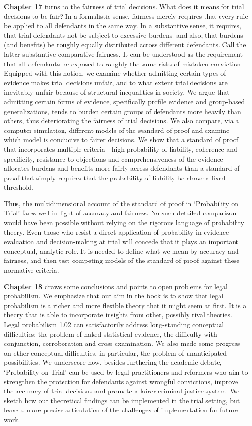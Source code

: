\documentclass[
  10pt,
  dvipsnames,enabledeprecatedfontcommands]{scrartcl}
\begin{document}
\textbf{Chapter 17} turns to the fairness of trial decisions. What does
it means for trial decisions to be fair? In a formalistic sense,
fairness merely requires that every rule be applied to all defendants in
the same way. In a substantive sense, it requires, that trial defendants
not be subject to excessive burdens, and also, that burdens (and
benefits) be roughly equally distributed across different defendants.
Call the latter substantive comparative fairness. It can be understood
as the requirement that all defendants be exposed to roughly the same
risks of mistaken conviction. Equipped with this notion, we examine
whether admitting certain types of evidence makes trial decisions
unfair, and to what extent trial decisions are inevitably unfair because
of structural inequalities in society. We argue that admitting certain
forms of evidence, specifically profile evidence and group-based
generalizations, tends to burden certain groups of defendants more
heavily than others, thus deteriorating the fairness of trial decisions.
We also compare, via a computer simulation, different models of the
standard of proof and examine which model is conducive to fairer
decisions. We show that a standard of proof that incorporates multiple
criteria---high probability of liability, coherence and specificity,
resistance to objections and comprehensiveness of the
evidence---allocates burdens and benefits more fairly across defendants
than a standard of proof that simply requires that the probability of
liability be above a fixed threshold.

Thus, the multidimensional account of the standard of proof in
`Probability on Trial' fares well in light of accuracy and fairness. No
such detailed comparison would have been possible without relying on the
rigorous language of probability theory. Even those who resist a direct
application of probability in evidence evaluation and decision-making at
trial will concede that it plays an important conceptual, analytic role.
It is needed to define what we mean by accuracy and fairness, and then
test competing models of the standard of proof against these normative
criteria.

\textbf{Chapter 18} draws some conclusions and points to open problems
for legal probabilism. We emphasize that our aim in the book is to show
that legal probabilism is a richer and more flexible theory that it
might seem at first. It is a theory that is able to incorporate insights
from other, possibly rival theories. Legal probabilism 1.02 can
satisfactorily address long-standing conceptual difficulties: the
problem of naked statistical evidence, the difficulty with conjunction,
corroboration and cross-examination. We also made some progress on other
conceptual difficulties, in particular, the problem of unanticipated
possibilities. We underscore how, besides furthering the academic
debate, `Probability on Trial' can be used by legal practitioners and
reformers who aim to strengthen the protection for defendants against
wrongful convictions, improve the accuracy of trial decisions and
promote a fairer criminal justice system. We sketch how our theoretical
findings can be implemented in the trial setting, but leave a more
precise articulation of the challenges of implementation for future
work.
\end{document}
